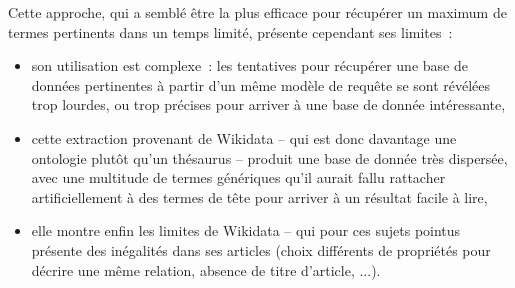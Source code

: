Cette approche, qui a semblé être la plus efficace pour récupérer un maximum de termes pertinents dans un temps limité, présente cependant ses limites~: 
\begin{itemize}
	\item son utilisation est complexe~: les tentatives pour récupérer une base de données pertinentes à partir d'un même modèle de requête se sont révélées trop lourdes, ou trop précises pour arriver à une base de donnée intéressante,
	\item cette extraction provenant de Wikidata -- qui est donc davantage une ontologie plutôt qu'un thésaurus -- produit une base de donnée très dispersée, avec une multitude de termes génériques qu'il aurait fallu rattacher artificiellement à des termes de tête pour arriver à un résultat facile à lire,
	\item elle montre enfin les limites de Wikidata -- qui pour ces sujets pointus présente des inégalités dans ses articles (choix différents de propriétés pour décrire une même relation, absence de titre d'article, ...).
\end{itemize}



